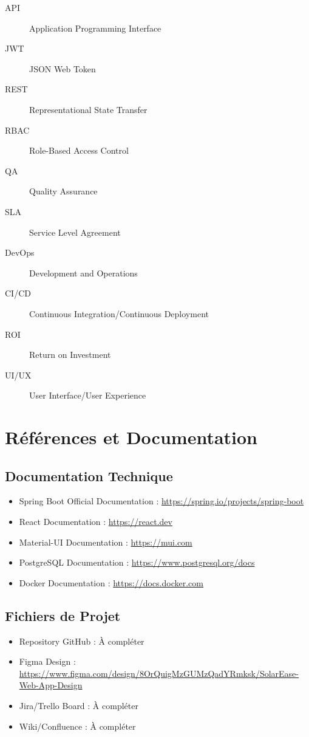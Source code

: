 \documentclass[12pt,a4paper,french]{report}
\begin{document}
\begin{description}
    \item[API] Application Programming Interface
    \item[JWT] JSON Web Token
    \item[REST] Representational State Transfer
    \item[RBAC] Role-Based Access Control
    \item[QA] Quality Assurance
    \item[SLA] Service Level Agreement
    \item[DevOps] Development and Operations
    \item[CI/CD] Continuous Integration/Continuous Deployment
    \item[ROI] Return on Investment
    \item[UI/UX] User Interface/User Experience
\end{description}

\chapter{Références et Documentation}

\section{Documentation Technique}

\begin{itemize}
    \item Spring Boot Official Documentation : \url{https://spring.io/projects/spring-boot}
    \item React Documentation : \url{https://react.dev}
    \item Material-UI Documentation : \url{https://mui.com}
    \item PostgreSQL Documentation : \url{https://www.postgresql.org/docs}
    \item Docker Documentation : \url{https://docs.docker.com}
\end{itemize}

\section{Fichiers de Projet}

\begin{itemize}
    \item Repository GitHub : À compléter
    \item Figma Design : \url{https://www.figma.com/design/8OrQuigMzGUMzQadYRmksk/SolarEase-Web-App-Design}
    \item Jira/Trello Board : À compléter
    \item Wiki/Confluence : À compléter
\end{itemize}
\end{document}

